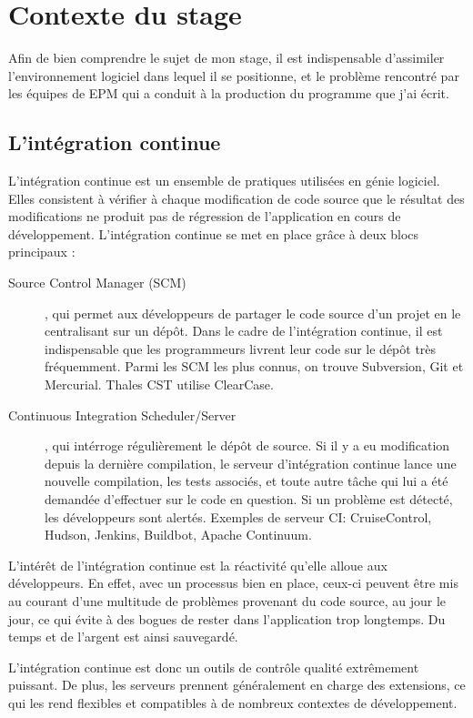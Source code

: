 \section{Contexte du stage}

Afin de bien comprendre le sujet de mon stage, il est indispensable d'assimiler 
l'environnement logiciel dans lequel il se positionne, et le problème rencontré 
par les équipes de EPM qui a conduit à la production du programme que j'ai 
écrit.

\subsection{L'intégration continue}

L'intégration continue est un ensemble de pratiques utilisées en génie logiciel.
Elles consistent à vérifier à chaque modification de code source que le résultat
des modifications ne produit pas de régression de l'application en cours de 
développement. L'intégration continue se met en place grâce à deux blocs 
principaux :
\begin{description}
	\item[Source Control Manager (SCM)], qui permet aux développeurs de partager
	le code source d'un projet en le centralisant sur un dépôt. Dans le cadre de
	l'intégration continue, il est indispensable que les programmeurs livrent 
	leur code sur le dépôt très fréquemment. Parmi les SCM les plus connus, on
	trouve Subversion, Git et Mercurial. Thales CST utilise ClearCase.
	\item[Continuous Integration Scheduler/Server], qui intérroge régulièrement 
	le dépôt 
	de source. Si il y a eu modification depuis la dernière compilation, le 
	serveur d'intégration continue lance une nouvelle compilation, les tests 
	associés, et toute autre tâche qui lui a été demandée d'effectuer sur le 
	code en question. Si un problème est détecté, les développeurs sont alertés.
	Exemples de serveur CI: CruiseControl, Hudson, Jenkins, Buildbot, Apache 
	Continuum.
\end{description}

L'intérêt de l'intégration continue est la réactivité qu'elle alloue 
aux développeurs. En effet, avec un processus bien en place, ceux-ci peuvent 
être mis au courant d'une multitude de problèmes provenant du code source, 
au jour le jour, ce qui évite à des bogues de rester dans l'application trop 
longtemps. Du temps et de l'argent est ainsi sauvegardé.

L'intégration continue est donc un outils de contrôle qualité extrêmement 
puissant. De plus, les serveurs prennent généralement en charge des extensions, 
ce qui les rend flexibles et compatibles à de nombreux contextes de 
développement.


